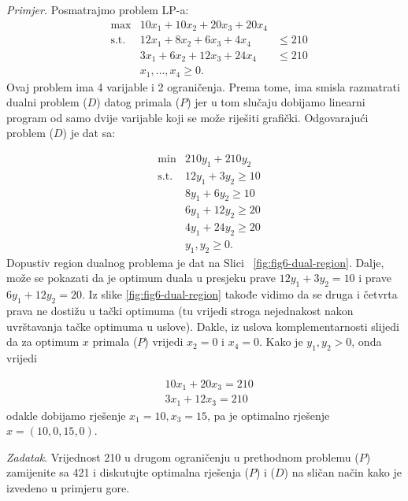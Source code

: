 \documentclass[a4paper, utf8, 11pt, colorlinks]{book}
\begin{document}
\emph{Primjer.} Posmatrajmo problem LP-a:
$$\begin{array}{llll}
   &\max                     &10 x_1 + 10 x_2 + 20 x_3 + 20 x_4  & \\
   &\mbox{s.t. }      &12 x_1 + 8 x_2  + 6 x_3  + 4 x_4   & \leq 210 \\
    &                        &3 x_1 + 6 x_2   + 12 x_3 + 24 x_4 & \leq 210 \\
     &                       & x_1,\ldots, x_4 \geq 0.                                 &
\end{array}
$$
Ovaj problem ima 4 varijable i 2 ograničenja. Prema tome, ima smisla razmatrati dualni problem  ($D$)  datog primala  ($P$)  jer u tom slučaju dobijamo linearni program od samo dvije varijable koji se može riješiti grafički.  Odgovarajući problem ($D$) je dat sa:

$$\begin{array}{lll}
    &\min                    &  210 y_1 + 210 y_2      \\
    &\mbox{s.t. }     &  12 y_1  + 3   y_2 \geq 10 \\
    &                        &  8  y_1 + 6    y_2 \geq 10 \\
    &                        &  6 y_1 + 12 y_2  \geq 20 \\
    &                        &  4 y_1 + 24 y_2  \geq 20 \\
    &                        &  y_1, y_2 \geq 0.
\end{array}$$
Dopustiv region dualnog problema je dat na Slici~ \ref{fig:fig6-dual-region}. %
Dalje, može se pokazati da je optimum duala u presjeku prave $12 y_1 + 3 y_2 = 10$ i prave $6y_1 + 12 y_2 = 20$. Iz slike \ref{fig:fig6-dual-region} takođe vidimo da se druga i četvrta prava ne dostižu u tački optimuma (tu vrijedi stroga nejednakost nakon uvrštavanja tačke optimuma u uslove). Dakle, iz uslova komplementarnosti slijedi da za optimum $x$ primala  ($P$)  vrijedi $x_2 = 0$ i $x_4 = 0$.  Kako je $y_1, y_2 > 0$, onda vrijedi 

\begin{align}
    &10 x_1 + 20 x_3 = 210 \nonumber \\
    & 3x_1 + 12 x_3  = 210 \nonumber
\end{align}
odakle dobijamo rješenje $x_1 = 10, x_3 = 15$, pa je optimalno rješenje $x = (10, 0, 15, 0)$.

\emph{Zadatak}. Vrijednost 210 u drugom ograničenju u prethodnom problemu  ($P$)  zamijenite sa 421 i diskutujte optimalna rješenja  ($P$)  i  ($D$)  na sličan način kako je izvedeno  u primjeru gore.
\end{document}
